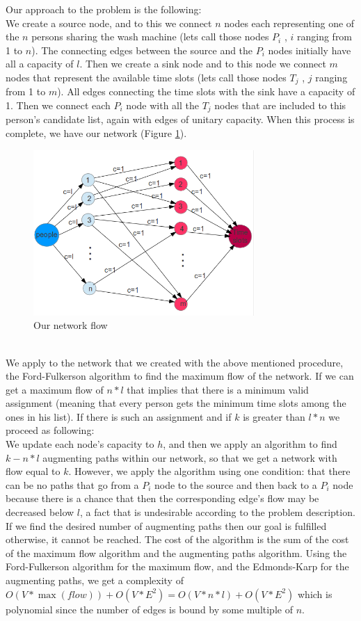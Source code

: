 Our approach to the problem is the following:\\
We create a source node, and to this we connect $n$ nodes each representing one of the $n$ persons sharing the wash machine (lets call those nodes $P_i$ , $i$ ranging from 1 to $n$). The connecting edges between the source and the $P_i$ nodes initially have all a capacity of $l$. Then we create a sink node and to this node we connect $m$ nodes that represent the available time slots (lets call those nodes $T_j$ , $j$ ranging from 1 to $m$). All edges connecting the time slots with the sink have a capacity of 1. Then we connect each $P_i$ node with all the $T_j$ nodes that are included to this person's candidate list, again with edges of unitary capacity. When this process is complete, we have our network (Figure \ref{fig:prob3}).\\
\begin{figure}[ht]
\centering
\includegraphics[width=0.75\textwidth]{prob3}%
\caption{Our network flow}%
\label{fig:prob3}%
\end{figure}
\\
We apply to the network that we created with the above mentioned procedure, the Ford-Fulkerson algorithm to find the maximum flow of the network. If we can get a maximum flow of $n*l$ that implies that there is a minimum valid assignment (meaning that every person gets the minimum time slots among the ones in his list). If there is such an assignment and if $k$ is greater than $l*n$ we proceed as following:\\
We update each node's capacity to $h$, and then we apply an algorithm to find ${k-n*l}$ augmenting paths within our network, so that we get a network with flow equal to $k$. However, we apply the algorithm using one condition: that there can be no paths that go from a $P_i$ node to the source and then back to a $P_i$ node because there is a chance that then the corresponding edge's flow may be decreased below $l$, a fact that is undesirable according to the problem description.\\
If we find the desired number of augmenting paths then our goal is fulfilled otherwise, it cannot be reached. The cost of the algorithm is the sum of the cost of the maximum flow algorithm and the augmenting paths algorithm. Using the Ford-Fulkerson algorithm for the maximum flow, and the Edmonds-Karp for the augmenting paths, we get a complexity of $O(V* \max (flow))+O(V*E^2) = O(V*n*l)+O(V*E^2)$ which is polynomial since the number of edges is bound by some multiple of $n$.
